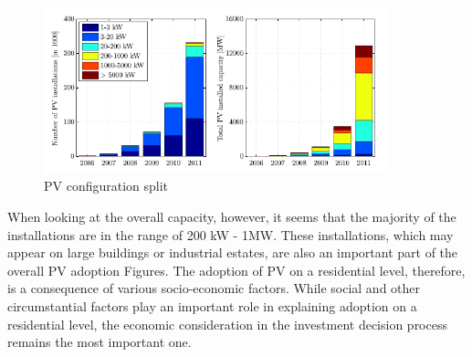 \newline 
\begin{figure}[h!]
\centering
\includegraphics[width=10cm]{PVsplit.PNG}
\caption[PV configuration split]{PV configuration split \cite{ItalyAdoption}}
\label{Figure:split}
\end{figure}
\newline 
When looking at the overall capacity, however, it seems that the majority of the installations are in the range of 200 kW - 1MW. These installations, which may appear on large buildings or industrial estates, are also an important part of the overall PV adoption Figures. The adoption of PV on a residential level, therefore, is a consequence of various socio-economic factors. While social and other circumstantial factors play an important role in explaining adoption on a residential level, the economic consideration in the investment decision process remains the most important one.
